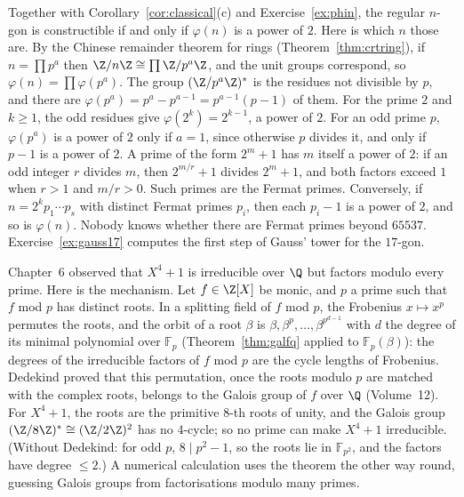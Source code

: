 Together with Corollary~\ref{cor:classical}(c) and Exercise~\ref{ex:phin}, the regular $n$-gon is constructible if and only if $\varphi(n)$ is a power of $2$. Here is which $n$ those are. By the Chinese remainder theorem for rings (Theorem~\ref{thm:crtring}), if $n=\prod p^{a}$ then $\Z/n\Z\cong\prod\Z/p^{a}\Z$, and the unit groups correspond, so $\varphi(n)=\prod\varphi(p^{a})$. The group $(\Z/p^{a}\Z)^*$ is the residues not divisible by $p$, and there are $\varphi(p^{a})=p^{a}-p^{a-1}=p^{a-1}(p-1)$ of them. For the prime $2$ and $k\ge1$, the odd residues give $\varphi(2^{k})=2^{k-1}$, a power of $2$. For an odd prime $p$, $\varphi(p^{a})$ is a power of $2$ only if $a=1$, since otherwise $p$ divides it, and only if $p-1$ is a power of $2$. A prime of the form $2^{m}+1$ has $m$ itself a power of $2$: if an odd integer $r$ divides $m$, then $2^{m/r}+1$ divides $2^{m}+1$, and both factors exceed $1$ when $r>1$ and $m/r>0$. Such primes are the Fermat primes. Conversely, if $n=2^{k}p_1\cdots p_s$ with distinct Fermat primes $p_i$, then each $p_i-1$ is a power of $2$, and so is $\varphi(n)$. Nobody knows whether there are Fermat primes beyond $65537$. Exercise~\ref{ex:gauss17} computes the first step of Gauss' tower for the $17$-gon.

\begin{remark}
Chapter~6 observed that $X^4+1$ is irreducible over $\Q$ but factors modulo every prime. Here is the mechanism. Let $f\in\Z[X]$ be monic, and $p$ a prime such that $f$ mod $p$ has distinct roots. In a splitting field of $f$ mod $p$, the Frobenius $x\mapsto x^p$ permutes the roots, and the orbit of a root $\beta$ is $\beta,\beta^p,\dots,\beta^{p^{d-1}}$ with $d$ the degree of its minimal polynomial over $\mathbb F_p$ (Theorem~\ref{thm:galfq} applied to $\mathbb F_p(\beta)$): the degrees of the irreducible factors of $f$ mod $p$ are the cycle lengths of Frobenius. Dedekind proved that this permutation, once the roots modulo $p$ are matched with the complex roots, belongs to the Galois group of $f$ over $\Q$ (Volume~12). For $X^4+1$, the roots are the primitive $8$-th roots of unity, and the Galois group $(\Z/8\Z)^*\cong(\Z/2\Z)^2$ has no $4$-cycle; so no prime can make $X^4+1$ irreducible. (Without Dedekind: for odd $p$, $8\mid p^2-1$, so the roots lie in $\mathbb F_{p^2}$, and the factors have degree $\le2$.) A numerical calculation uses the theorem the other way round, guessing Galois groups from factorisations modulo many primes.
\end{remark}

